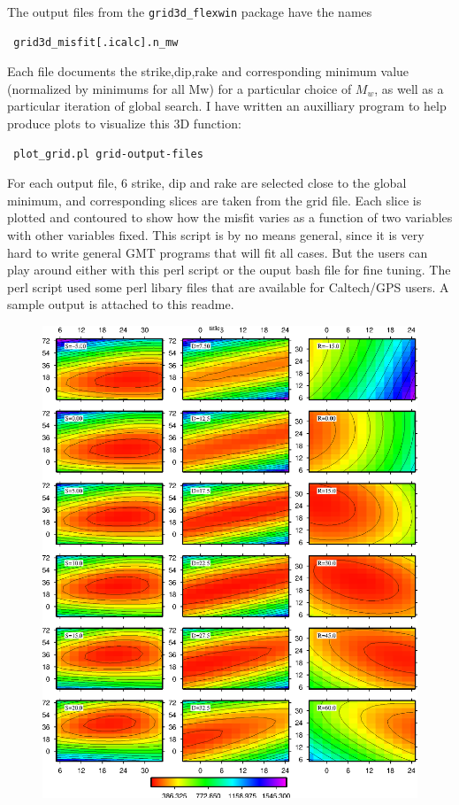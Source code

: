 \documentclass[12pt,titlepage,fleqn]{article}
\begin{document}
The output files from the \verb-grid3d_flexwin- package have the names
\begin{verbatim}
 grid3d_misfit[.icalc].n_mw
\end{verbatim}
Each file documents the strike,dip,rake and corresponding minimum value (normalized by minimums for all Mw) for a particular choice of $M_w$, as well as a particular iteration of global search. I have written an auxilliary program to help produce plots to visualize this 3D function:
\begin{verbatim}
 plot_grid.pl grid-output-files
\end{verbatim}
For each output file, 6 strike, dip and rake are selected close to the global minimum, and corresponding slices are taken from the grid file. Each slice is plotted and contoured to show how the misfit varies as a function of two variables with other variables fixed. This script is by no means general, since it is very hard to write general GMT programs that will fit all cases. But the users can play around either with this perl script or the ouput bash file for fine tuning. The perl script used some perl libary files that are available for Caltech/GPS users. A sample output is attached to this readme.

\begin{figure}
\begin{center}
     \includegraphics[width=6in]{grid_0.eps}%
  \end{center}
\end{figure}

\end{document}
